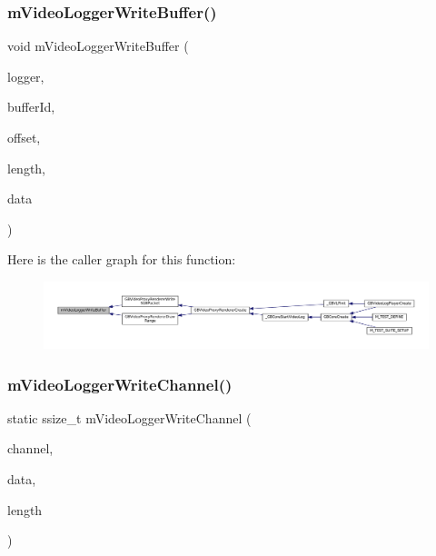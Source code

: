 \subsubsection{\texorpdfstring{m\+Video\+Logger\+Write\+Buffer()}{mVideoLoggerWriteBuffer()}}
{\footnotesize\ttfamily void m\+Video\+Logger\+Write\+Buffer (\begin{DoxyParamCaption}\item[{struct m\+Video\+Logger $\ast$}]{logger,  }\item[{uint32\+\_\+t}]{buffer\+Id,  }\item[{uint32\+\_\+t}]{offset,  }\item[{uint32\+\_\+t}]{length,  }\item[{const void $\ast$}]{data }\end{DoxyParamCaption})}

Here is the caller graph for this function\+:
\nopagebreak
\begin{figure}[H]
\begin{center}
\leavevmode
\includegraphics[width=350pt]{video-logger_8c_a1548cd96c67d81fecdd4e71df06c6b2f_icgraph}
\end{center}
\end{figure}
\mbox{\label{video-logger_8c_a4ff0364da23c84ee35e9e6cd4118a1bb}} 
\subsubsection{\texorpdfstring{m\+Video\+Logger\+Write\+Channel()}{mVideoLoggerWriteChannel()}}
{\footnotesize\ttfamily static ssize\+\_\+t m\+Video\+Logger\+Write\+Channel (\begin{DoxyParamCaption}\item[{struct m\+Video\+Log\+Channel $\ast$}]{channel,  }\item[{const void $\ast$}]{data,  }\item[{size\+\_\+t}]{length }\end{DoxyParamCaption})\hspace{0.3cm}{\ttfamily [static]}}


